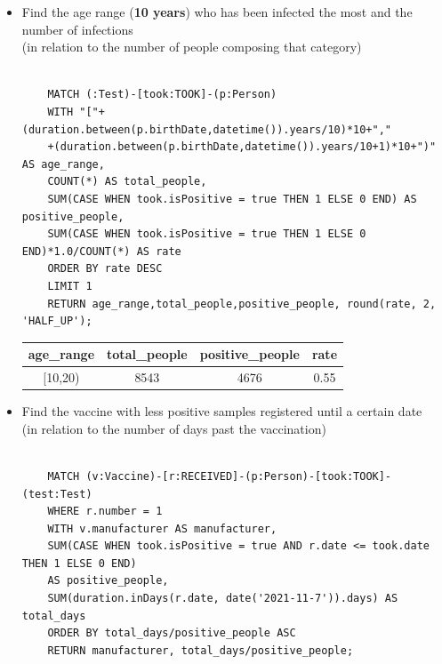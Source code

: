 \documentclass{article}[IEEEtran]
\begin{document}
\begin{itemize}
    \item Find the age range (\textbf{10 years}) who has been infected the most and the number of
    infections \\ (in relation to the number of people composing that category)

    \begin{lstlisting}
    
    MATCH (:Test)-[took:TOOK]-(p:Person)
    WITH "["+(duration.between(p.birthDate,datetime()).years/10)*10+","
    +(duration.between(p.birthDate,datetime()).years/10+1)*10+")" AS age_range,
    COUNT(*) AS total_people, 
    SUM(CASE WHEN took.isPositive = true THEN 1 ELSE 0 END) AS positive_people,
    SUM(CASE WHEN took.isPositive = true THEN 1 ELSE 0 END)*1.0/COUNT(*) AS rate
    ORDER BY rate DESC
    LIMIT 1
    RETURN age_range,total_people,positive_people, round(rate, 2, 'HALF_UP');

    \end{lstlisting}
    
    \vspace{-1cm}
    
    \begin{table}[H]
    \hspace{1.48cm}
    \begin{tabular}{|c|c|c|c|}
    \hline
    \textbf{age\_range} & \textbf{total\_people} & \textbf{positive\_people} & \textbf{rate}     \\ \hline
    {[}10,20)           & 8543                   & 4676                      & 0.55 \\ \hline
    \end{tabular}%
    \end{table}
    
    \item  Find the vaccine with less positive samples registered until a certain date \\ (in relation to the number of days past the vaccination)
    
    \begin{lstlisting}
    
    MATCH (v:Vaccine)-[r:RECEIVED]-(p:Person)-[took:TOOK]-(test:Test)
    WHERE r.number = 1
    WITH v.manufacturer AS manufacturer, 
    SUM(CASE WHEN took.isPositive = true AND r.date <= took.date THEN 1 ELSE 0 END) 
    AS positive_people, 
    SUM(duration.inDays(r.date, date('2021-11-7')).days) AS total_days
    ORDER BY total_days/positive_people ASC
    RETURN manufacturer, total_days/positive_people;
    

\end{lstlisting}
\end{itemize}
\end{document}
